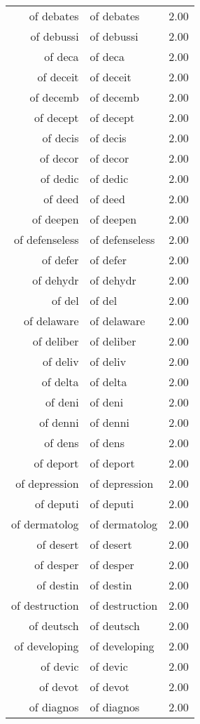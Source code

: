\begin{table}[ht]
\begin{tabular}{rlr}
  of debates & of debates & 2.00 \\ 
  of debussi & of debussi & 2.00 \\ 
  of deca & of deca & 2.00 \\ 
  of deceit & of deceit & 2.00 \\ 
  of decemb & of decemb & 2.00 \\ 
  of decept & of decept & 2.00 \\ 
  of decis & of decis & 2.00 \\ 
  of decor & of decor & 2.00 \\ 
  of dedic & of dedic & 2.00 \\ 
  of deed & of deed & 2.00 \\ 
  of deepen & of deepen & 2.00 \\ 
  of defenseless & of defenseless & 2.00 \\ 
  of defer & of defer & 2.00 \\ 
  of dehydr & of dehydr & 2.00 \\ 
  of del & of del & 2.00 \\ 
  of delaware & of delaware & 2.00 \\ 
  of deliber & of deliber & 2.00 \\ 
  of deliv & of deliv & 2.00 \\ 
  of delta & of delta & 2.00 \\ 
  of deni & of deni & 2.00 \\ 
  of denni & of denni & 2.00 \\ 
  of dens & of dens & 2.00 \\ 
  of deport & of deport & 2.00 \\ 
  of depression & of depression & 2.00 \\ 
  of deputi & of deputi & 2.00 \\ 
  of dermatolog & of dermatolog & 2.00 \\ 
  of desert & of desert & 2.00 \\ 
  of desper & of desper & 2.00 \\ 
  of destin & of destin & 2.00 \\ 
  of destruction & of destruction & 2.00 \\ 
  of deutsch & of deutsch & 2.00 \\ 
  of developing & of developing & 2.00 \\ 
  of devic & of devic & 2.00 \\ 
  of devot & of devot & 2.00 \\ 
  of diagnos & of diagnos & 2.00 \\ 

\end{tabular}
\end{table}
